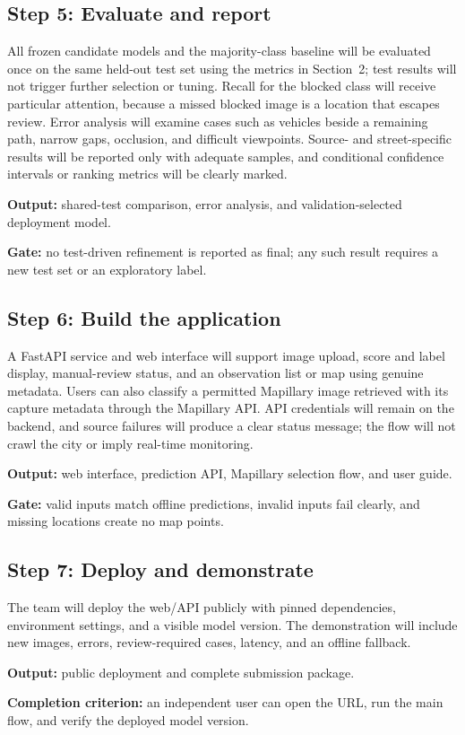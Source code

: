\subsection{Step 5: Evaluate and report}

All frozen candidate models and the majority-class baseline will be evaluated once on the same held-out test set using the metrics in Section~2; test results will not trigger further selection or tuning. Recall for the blocked class will receive particular attention, because a missed blocked image is a location that escapes review. Error analysis will examine cases such as vehicles beside a remaining path, narrow gaps, occlusion, and difficult viewpoints. Source- and street-specific results will be reported only with adequate samples, and conditional confidence intervals or ranking metrics will be clearly marked.

\textbf{Output:} shared-test comparison, error analysis, and validation-selected deployment model.

\textbf{Gate:} no test-driven refinement is reported as final; any such result requires a new test set or an exploratory label.

\subsection{Step 6: Build the application}

A FastAPI service and web interface will support image upload, score and label display, manual-review status, and an observation list or map using genuine metadata. Users can also classify a permitted Mapillary image retrieved with its capture metadata through the Mapillary API. API credentials will remain on the backend, and source failures will produce a clear status message; the flow will not crawl the city or imply real-time monitoring.

\textbf{Output:} web interface, prediction API, Mapillary selection flow, and user guide.

\textbf{Gate:} valid inputs match offline predictions, invalid inputs fail clearly, and missing locations create no map points.

\subsection{Step 7: Deploy and demonstrate}

The team will deploy the web/API publicly with pinned dependencies, environment settings, and a visible model version. The demonstration will include new images, errors, review-required cases, latency, and an offline fallback.

\textbf{Output:} public deployment and complete submission package.

\textbf{Completion criterion:} an independent user can open the URL, run the main flow, and verify the deployed model version.
